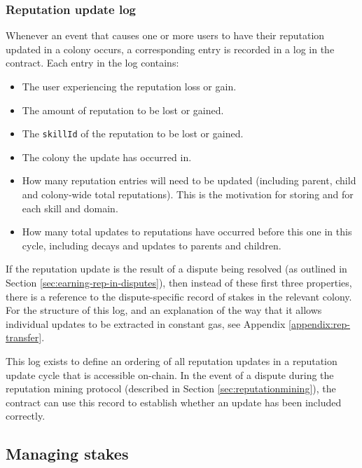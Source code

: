 \subsubsection{Reputation update log}\label{subsec:reputation-update-log}

Whenever an event that causes one or more users to have their reputation updated in a colony occurs, a corresponding entry is recorded in a log in the  contract. Each entry in the log contains:

\begin{itemize}
\item The user experiencing the reputation loss or gain.
\item The amount of reputation to be lost or gained.
\item The \texttt{skillId} of the reputation to be lost or gained.
\item The colony the update has occurred in.
\item How many reputation entries will need to be updated (including parent, child and colony-wide total reputations). This is the motivation for storing  and  for each skill and domain.
\item How many total updates to reputations have occurred before this one in this cycle, including decays and updates to parents and children.
\end{itemize}

If the reputation update is the result of a dispute being resolved (as outlined in Section \ref{sec:earning-rep-in-disputes}), then instead of these first three properties, there is a reference to the dispute-specific record of stakes in the relevant colony. For the structure of this log, and an explanation of the way that it allows individual updates to be extracted in constant gas, see Appendix \ref{appendix:rep-transfer}.

This log exists to define an ordering of all reputation updates in a reputation update cycle that is accessible on-chain. In the event of a dispute during the reputation mining protocol (described in Section \ref{sec:reputationmining}), the  contract can use this record to establish whether an update has been included correctly.

\subsection{Managing stakes}\label{sec:stakes}

